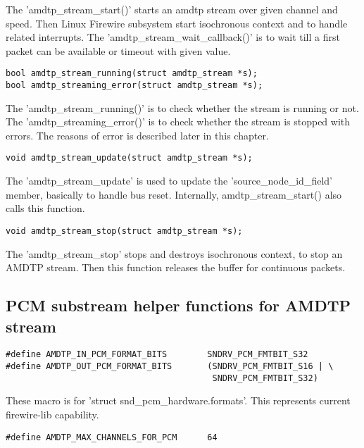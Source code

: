\documentclass[onecolumn]{article}
\begin{document}
The 'amdtp\_stream\_start()' starts an amdtp stream over given channel and speed. Then Linux Firewire subsystem start isochronous context and to handle related interrupts. The 'amdtp\_stream\_wait\_callback()' is to wait till a first packet can be available or timeout with given value.

\begin{verbatim}
bool amdtp_stream_running(struct amdtp_stream *s);
bool amdtp_streaming_error(struct amdtp_stream *s);
\end{verbatim}

The 'amdtp\_stream\_running()' is to check whether the stream is running or not. The 'amdtp\_streaming\_error()' is to check whether the stream is stopped with errors. The reasons of error is described later in this chapter.

\begin{verbatim}
void amdtp_stream_update(struct amdtp_stream *s);
\end{verbatim}

The 'amdtp\_stream\_update' is used to update the 'source\_node\_id\_field' member, basically to handle bus reset. Internally, amdtp\_stream\_start() also calls this function.

\begin{verbatim}
void amdtp_stream_stop(struct amdtp_stream *s);
\end{verbatim}

The 'amdtp\_stream\_stop' stops and destroys isochronous context, to stop an AMDTP stream. Then this function releases the buffer for continuous packets.

\subsection{PCM substream helper functions for AMDTP stream}

\begin{verbatim}
#define AMDTP_IN_PCM_FORMAT_BITS        SNDRV_PCM_FMTBIT_S32
#define AMDTP_OUT_PCM_FORMAT_BITS       (SNDRV_PCM_FMTBIT_S16 | \
                                         SNDRV_PCM_FMTBIT_S32)
\end{verbatim}

These macro is for 'struct snd\_pcm\_hardware.formats'. This represents current firewire-lib capability.

\begin{verbatim}
#define AMDTP_MAX_CHANNELS_FOR_PCM      64
\end{verbatim}
\end{document}
